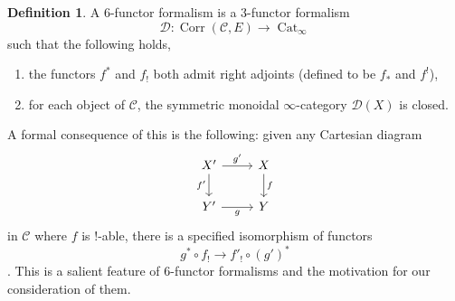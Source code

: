 \documentclass{article}
\theoremstyle{definition}
\newtheorem{definition}[theorem]{Definition}
\theoremstyle{remark}
\DeclareMathOperator{\corr}{Corr}
\DeclareMathOperator{\cat}{Cat}
\begin{document}
\begin{definition} A 6-functor formalism is a 3-functor formalism
$$ \mathcal{D}: \corr(\mathcal{C},E) \to \cat_\infty$$
such that the following holds,
\begin{enumerate}
  \item the functors $f^*$ and $f_!$ both admit right adjoints (defined to be $f_*$ and $f^!$),
  \item for each object of $\mathcal{C}$, the symmetric monoidal $\infty$-category $\mathcal{D}(X)$ is closed.
\end{enumerate}
\end{definition}

A formal consequence of this is the following: given any Cartesian diagram
\[\begin{tikzcd}
  {X'} & X \\
  {Y'} & Y
  \arrow["{g'}", from=1-1, to=1-2]{}
  \arrow["{f'}"', from=1-1, to=2-1]
  \arrow["f", from=1-2, to=2-2]
  \arrow["g"', from=2-1, to=2-2]
\end{tikzcd}\]
in $\mathcal{C}$ where $f$ is $!$-able, 
there is a specified isomorphism of functors $$g^* \circ f_! \to f'_! \circ (g')^*$$ \cite{Mann22}. This is a salient feature of 6-functor formalisms and the motivation for our consideration of them.
\end{document}
